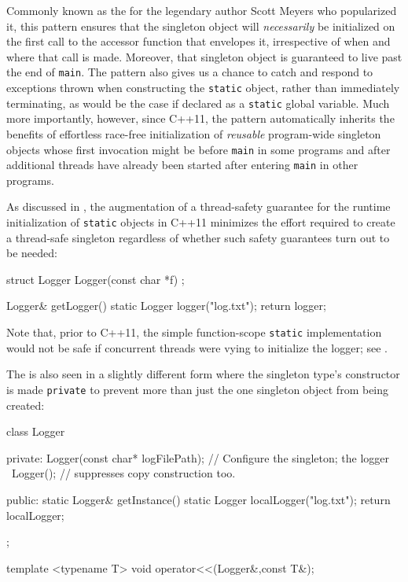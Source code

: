 \noindent Commonly known as the  for the
legendary author Scott Meyers who popularized it, this pattern ensures that the
singleton object will \emph{necessarily} be initialized on the first
call to the accessor function that envelopes it, irrespective of when
and where that call is made. Moreover, that singleton object is
guaranteed to live past the end of \lstinline!main!. The  pattern also gives us a chance to catch and respond to
exceptions thrown when constructing the \lstinline!static! object, rather
than immediately terminating, as would be the case if declared as a
\lstinline!static! global variable. Much more importantly, however, since C++11, the
 pattern automatically inherits the benefits of
effortless race-free initialization of \emph{reusable} program-wide
singleton objects whose first invocation might be before \lstinline!main!
in some programs and after additional threads have already been started
after entering \lstinline!main! in other programs.

As discussed in , the augmentation of a
thread-safety guarantee for the runtime initialization of
 \lstinline!static! objects in C++11 minimizes the
effort required to create a thread-safe singleton regardless of whether
such safety guarantees turn out to be needed:

\begin{emcppshiddenlisting}[emcppsbatch=e9]
struct Logger {
  Logger(const char *f) {}
};
\end{emcppshiddenlisting}
\begin{emcppslisting}[emcppsbatch=e9]
Logger& getLogger()
{
    static Logger logger("log.txt");
    return logger;
}
\end{emcppslisting}

\noindent Note that, prior to C++11, the simple function-scope \lstinline!static!
implementation would not be safe if concurrent threads were vying to
initialize the logger; see .

The  is also seen in a slightly different form
where the singleton type's constructor is made \lstinline!private! to
prevent more than just the one singleton object from being created:

\begin{emcppslisting}[emcppsbatch=e10]
class Logger
{
private:
    Logger(const char* logFilePath);  // Configure the singleton; the logger
    ~Logger();                        // suppresses copy construction too.

public:
    static Logger& getInstance()
    {
        static Logger localLogger("log.txt");
        return localLogger;
    }
};
\end{emcppslisting}
\begin{emcppshiddenlisting}[emcppsbatch=e10]
template <typename T>
void operator<<(Logger&,const T&);
\end{emcppshiddenlisting}

